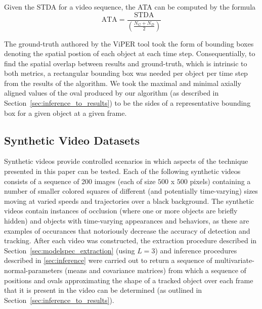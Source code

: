\documentclass[twocolumn, final]{svjour3}
\begin{document}
Given the STDA for a video sequence, the ATA can be computed by the formula
\begin{equation}
\text{ATA} = \frac{\text{STDA}}{\left( \frac{N_{G} + N_{D}}{2} \right)}
\end{equation}

The ground-truth authored by the ViPER tool took the form of bounding boxes denoting the spatial postion of each object at each time step. Consequentially, to find the spatial overlap between results and ground-truth, which is intrinsic to both metrics, a rectangular bounding box was needed per object per time step from the results of the algorithm. We took the maximal and minimal axially aligned values of the oval produced by our algorithm (as described in Section~\ref{sec:inference_to_results}) to be the sides of a representative bounding box for a given object at a given frame.

\subsection{Synthetic Video Datasets}
\label{sec:syntheticvideos}

Synthetic videos provide controlled scenarios in which aspects of the technique presented in this paper can be tested. Each of the following synthetic videos consists of a sequence of 200 images (each of size $500$ x $500$ pixels) containing a number of smaller colored squares of different (and potentially time-varying) sizes moving at varied speeds and trajectories over a black background. The synthetic videos contain instances of occlusion (where one or more objects are briefly hidden) and objects with time-varying appearances and behaviors, as these are examples of occurances that notoriously decrease the accuracy of detection and tracking. After each video was constructed, the extraction procedure described in Section~\ref{sec:modelspec_extraction} (using $L=3$) and inference procedures described in \ref{sec:inference} were carried out to return a sequence of multivariate-normal-parameters (means and covariance matrices) from which a sequence of positions and ovals approximating the shape of a tracked object over each frame that it is present in the video can be determined (as outlined in Section~\ref{sec:inference_to_results}).


\end{document}
